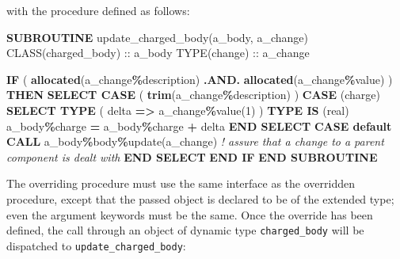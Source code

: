 \documentclass[
  paper=a4,
  ,captions=tableheading
]{scrartcl}
\newenvironment{Shaded}{\begin{snugshade}}{\end{snugshade}}
\newcommand{\CommentTok}[1]{\textcolor[rgb]{0.56,0.35,0.01}{\textit{#1}}}
\newcommand{\DataTypeTok}[1]{\textcolor[rgb]{0.13,0.29,0.53}{#1}}
\newcommand{\DecValTok}[1]{\textcolor[rgb]{0.00,0.00,0.81}{#1}}
\newcommand{\FunctionTok}[1]{\textcolor[rgb]{0.13,0.29,0.53}{\textbf{#1}}}
\newcommand{\KeywordTok}[1]{\textcolor[rgb]{0.13,0.29,0.53}{\textbf{#1}}}
\newcommand{\NormalTok}[1]{#1}
\newcommand{\OperatorTok}[1]{\textcolor[rgb]{0.81,0.36,0.00}{\textbf{#1}}}
\newcommand{\StringTok}[1]{\textcolor[rgb]{0.31,0.60,0.02}{#1}}
\begin{document}
with the procedure defined as follows:

\begin{Shaded}
\begin{Highlighting}[]
\KeywordTok{SUBROUTINE}\NormalTok{ update\_charged\_body(a\_body, a\_change)}
   \DataTypeTok{CLASS(charged\_body)} \DataTypeTok{::}\NormalTok{ a\_body}
   \DataTypeTok{TYPE(change)} \DataTypeTok{::}\NormalTok{ a\_change}

   \KeywordTok{IF}\NormalTok{ ( }\FunctionTok{allocated}\NormalTok{(a\_change}\OperatorTok{\%}\NormalTok{description) }\OperatorTok{.AND.} \FunctionTok{allocated}\NormalTok{(a\_change}\OperatorTok{\%}\DataTypeTok{value}\NormalTok{) ) }\KeywordTok{THEN}
      \KeywordTok{SELECT CASE}\NormalTok{ ( }\FunctionTok{trim}\NormalTok{(a\_change}\OperatorTok{\%}\NormalTok{description) )}
      \KeywordTok{CASE}\NormalTok{ (}\StringTok{\textquotesingle{}charge\textquotesingle{}}\NormalTok{)}
         \KeywordTok{SELECT TYPE}\NormalTok{ ( delta }\KeywordTok{=}\OperatorTok{\textgreater{}}\NormalTok{ a\_change}\OperatorTok{\%}\DataTypeTok{value}\NormalTok{(}\DecValTok{1}\NormalTok{) )}
         \KeywordTok{TYPE IS}\NormalTok{ (}\DataTypeTok{real}\NormalTok{)}
\NormalTok{            a\_body}\OperatorTok{\%}\NormalTok{charge }\KeywordTok{=}\NormalTok{ a\_body}\OperatorTok{\%}\NormalTok{charge }\KeywordTok{+}\NormalTok{ delta}
         \KeywordTok{END SELECT}
      \KeywordTok{CASE default}
         \KeywordTok{CALL}\NormalTok{ a\_body}\OperatorTok{\%}\NormalTok{body}\OperatorTok{\%}\NormalTok{update(a\_change)}
         \CommentTok{! assure that a change to a parent component is dealt with}
      \KeywordTok{END SELECT}
   \KeywordTok{END IF}
\KeywordTok{END SUBROUTINE}
\end{Highlighting}
\end{Shaded}

The overriding procedure must use the same interface as the overridden
procedure, except that the passed object is declared to be of the
extended type; even the argument keywords must be the same. Once the
override has been defined, the call through an object of dynamic type
\texttt{charged\_body} will be dispatched to
\texttt{update\_charged\_body}:
\end{document}
